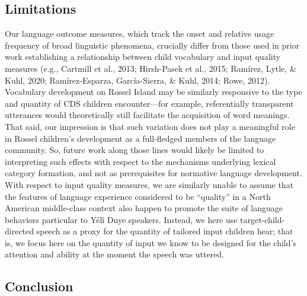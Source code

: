 \documentclass[
  english,
  ,man,floatsintext]{apa6}
\begin{document}
\hypertarget{limitations}{%
\subsection{Limitations}\label{limitations}}

Our language outcome measures, which track the onset and relative usage frequency of broad linguistic phenomena, crucially differ from those used in prior work establishing a relationship between child vocabulary and input quality measures (e.g., Cartmill et al., 2013; Hirsh-Pasek et al., 2015; Ramírez, Lytle, \& Kuhl, 2020; Ramírez-Esparza, García-Sierra, \& Kuhl, 2014; Rowe, 2012). Vocabulary development on Rossel Island may be similarly responsive to the type and quantity of CDS children encounter---for example, referentially transparent utterances would theoretically still facilitate the acquisition of word meanings. That said, our impression is that such variation does not play a meaningful role in Rossel children's development as a full-fledged members of the language community. So, future work along those lines would likely be limited to interpreting such effects with respect to the mechanisms underlying lexical category formation, and not as prerequisites for normative language development. With respect to input quality measures, we are similarly unable to assume that the features of language experience considered to be \enquote{quality} in a North American middle-class context also happen to promote the suite of language behaviors particular to Yélî Dnye speakers. Instead, we here use target-child-directed speech as a proxy for the quantity of tailored input children hear; that is, we focus here on the quantity of input we know to be designed for the child's attention and ability at the moment the speech was uttered.

\hypertarget{disc-conclusion}{%
\subsection{Conclusion}\label{disc-conclusion}}
\end{document}

